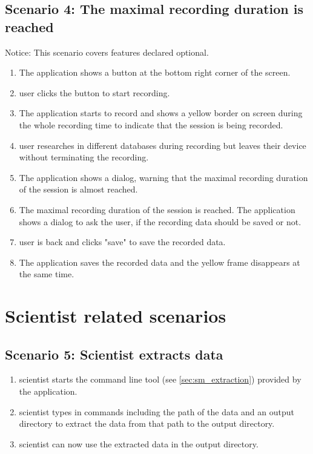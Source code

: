 \subsection{Scenario 4: The maximal recording duration is reached}
Notice: This scenario covers features declared optional.
\begin{enumerate}
    \item The application shows a button at the bottom right corner of the screen.
    \item \Gls{user} clicks the button to start recording.
    \item The application starts to record and shows a yellow border on screen during the whole recording time to indicate that the \gls{session} is being recorded.
    \item \Gls{user} researches in different databases during recording but leaves their \gls{device} without terminating the recording.
    \item The application shows a dialog, warning that the maximal recording duration of the \gls{session} \see[OC10] is almost reached.
    \item The maximal recording duration of the \gls{session} \see[OC10] is reached. The application shows a dialog to ask the \gls{user}, if the recording data should be saved or not.
    \item \Gls{user} is back and clicks "save" to save the recorded data.
    \item The application saves the recorded data and the yellow frame disappears at the same time.
\end{enumerate}

\section{Scientist related scenarios}
\subsection{Scenario 5: Scientist extracts data}
\begin{enumerate}
    \item \Gls{scientist} starts the command line tool (see \ref{sec:sm_extraction}) provided by the application.
    \item \Gls{scientist} types in commands including the path of the data and an output directory to extract the data from that path to the output directory.
    \item \Gls{scientist} can now use the extracted data in the output directory.
\end{enumerate}


